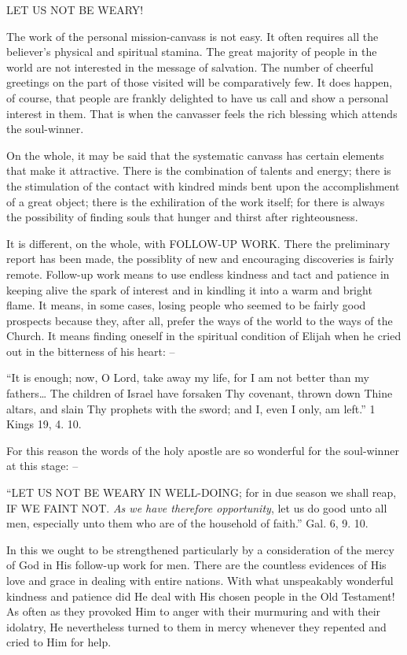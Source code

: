 \documentclass[
]{book}
\begin{document}
LET US NOT BE WEARY!

The work of the personal mission-canvass is not easy. It often requires all the believer's physical and spiritual stamina. The great majority of people in the world are not interested in the message of salvation. The number of cheerful greetings on the part of those visited will be comparatively few. It does happen, of course, that people are frankly delighted to have us call and show a personal interest in them. That is when the canvasser feels the rich blessing which attends the soul-winner.

On the whole, it may be said that the systematic canvass has certain elements that make it attractive. There is the combination of talents and energy; there is the stimulation of the contact with kindred minds bent upon the accomplishment of a great object; there is the exhiliration of the work itself; for there is always the possibility of finding souls that hunger and thirst after righteousness.

It is different, on the whole, with FOLLOW-UP WORK. There the preliminary report has been made, the possiblity of new and encouraging discoveries is fairly remote. Follow-up work means to use endless kindness and tact and patience in keeping alive the spark of interest and in kindling it into a warm and bright flame. It means, in some cases, losing people who seemed to be fairly good prospects because they, after all, prefer the ways of the world to the ways of the Church. It means finding oneself in the spiritual condition of Elijah when he cried out in the bitterness of his heart: --

``It is enough; now, O Lord, take away my life, for I am not better than my fathers\ldots{} The children of Israel have forsaken Thy covenant, thrown down Thine altars, and slain Thy prophets with the sword; and I, even I only, am left.'' 1 Kings 19, 4. 10.

For this reason the words of the holy apostle are so wonderful for the soul-winner at this stage: --

``LET US NOT BE WEARY IN WELL-DOING; for in due season we shall reap, IF WE FAINT NOT. \emph{As we have therefore opportunity}, let us do good unto all men, especially unto them who are of the household of faith.'' Gal. 6, 9. 10.

In this we ought to be strengthened particularly by a consideration of the mercy of God in His follow-up work for men. There are the countless evidences of His love and grace in dealing with entire nations. With what unspeakably wonderful kindness and patience did He deal with His chosen people in the Old Testament! As often as they provoked Him to anger with their murmuring and with their idolatry, He nevertheless turned to them in mercy whenever they repented and cried to Him for help.
\end{document}
